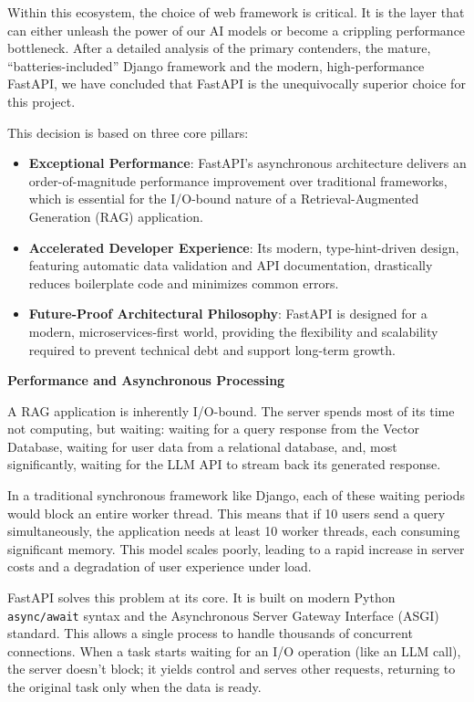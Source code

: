 Within this ecosystem, the choice of web framework is critical. It is the layer that can either unleash the power of our AI models or become a crippling performance bottleneck. After a detailed analysis of the primary contenders, the mature, ``batteries-included'' Django framework and the modern, high-performance FastAPI, we have concluded that FastAPI is the unequivocally superior choice for this project.

This decision is based on three core pillars:
\begin{itemize}
    \item \textbf{Exceptional Performance}: FastAPI's asynchronous architecture delivers an order-of-magnitude performance improvement over traditional frameworks, which is essential for the I/O-bound nature of a Retrieval-Augmented Generation (RAG) application.
    \item \textbf{Accelerated Developer Experience}: Its modern, type-hint-driven design, featuring automatic data validation and API documentation, drastically reduces boilerplate code and minimizes common errors.
    \item \textbf{Future-Proof Architectural Philosophy}: FastAPI is designed for a modern, microservices-first world, providing the flexibility and scalability required to prevent technical debt and support long-term growth.
\end{itemize}

\textbf{Performance and Asynchronous Processing}

A RAG application is inherently I/O-bound. The server spends most of its time not computing, but waiting: waiting for a query response from the Vector Database, waiting for user data from a relational database, and, most significantly, waiting for the LLM API to stream back its generated response.

In a traditional synchronous framework like Django, each of these waiting periods would block an entire worker thread. This means that if 10 users send a query simultaneously, the application needs at least 10 worker threads, each consuming significant memory. This model scales poorly, leading to a rapid increase in server costs and a degradation of user experience under load.

FastAPI solves this problem at its core. It is built on modern Python \texttt{async/await} syntax and the Asynchronous Server Gateway Interface (ASGI) standard. This allows a single process to handle thousands of concurrent connections. When a task starts waiting for an I/O operation (like an LLM call), the server doesn't block; it yields control and serves other requests, returning to the original task only when the data is ready.

